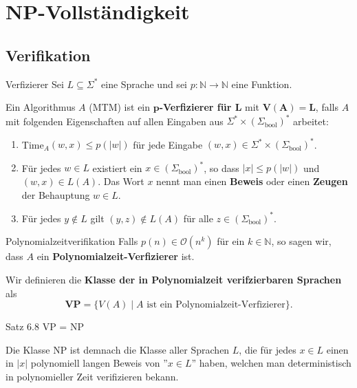\documentclass[a4paper, 11pt]{article}
\def\N{\mathbb{N}}
\def\O{\mathcal{O}}
\begin{document}
\section{NP-Vollständigkeit}

\subsection{Verifikation}

	\begin{mainbox}{Verfizierer}
		Sei $L \subseteq \Sigma^*$ eine Sprache und sei $p: \N \to \N$ eine Funktion. 
		
		Ein Algorithmus $A$ (MTM) ist ein 
		\textbf{$\mathbf{p}$-Verfizierer für $\mathbf{L}$} mit $\mathbf{V(A) = L}$, falls 
		$A$ mit folgenden Eigenschaften auf allen Eingaben aus $\Sigma^* \times (\Sigma_{\text{bool}})^*$ arbeitet:
		\begin{enumerate}[label=(\roman*)]
			
			\item Time$_A(w, x) \leq p(|w|)$ für jede Eingabe $(w, x) \in \Sigma^* \times (\Sigma_{\text{bool}})^*$. 
			
			\item Für jedes $w \in L$ existiert ein $x \in (\Sigma_{\text{bool}})^*$, so dass $|x| \leq p(|w|)$ 
			und $(w, x) \in L(A)$. Das Wort $x$ nennt man einen \textbf{Beweis} oder einen \textbf{Zeugen} 
			der Behauptung $w \in L$.
			
			\item Für jedes $y \notin L$ gilt $(y, z) \notin L(A)$ für alle $z \in (\Sigma_{\text{bool}})^*$. 
		\end{enumerate}
	\end{mainbox}

	\begin{mainbox}{Polynomialzeitverifikation}
		Falls $p(n) \in \O(n^k)$ für ein $k \in \N$, so sagen wir, dass $A$ ein \textbf{Polynomialzeit-Verfizierer} ist.

		Wir definieren die \textbf{Klasse der in Polynomialzeit verifzierbaren Sprachen} als 
		$$\textbf{VP} = \{V(A) \mid A \text{ ist ein Polynomialzeit-Verfizierer}\}.$$
	\end{mainbox}

	\begin{mainbox}{Satz 6.8}
		VP = NP
	\end{mainbox}
	Die Klasse NP ist demnach die Klasse aller Sprachen $L$, 
	die für jedes $x \in L$ einen in $|x|$ polynomiell langen Beweis von ''$x \in L$'' haben, 
	welchen man deterministisch in polynomieller Zeit verifizieren bekann. 
\end{document}
